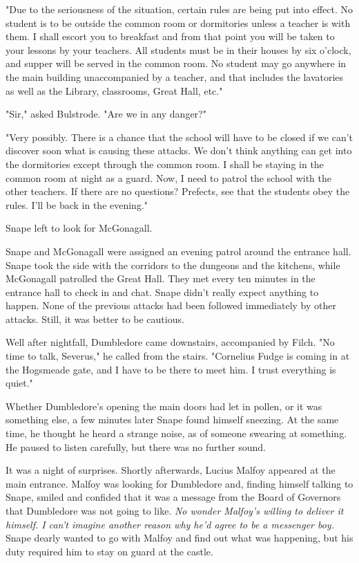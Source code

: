 "Due to the seriousness of the situation, certain rules are being put into effect. No student is to be outside the common room or dormitories unless a teacher is with them. I shall escort you to breakfast and from that point you will be taken to your lessons by your teachers. All students must be in their houses by six o'clock, and supper will be served in the common room. No student may go anywhere in the main building unaccompanied by a teacher, and that includes the lavatories as well as the Library, classrooms, Great Hall, etc."

"Sir," asked Bulstrode. "Are we in any danger?"

"Very possibly. There is a chance that the school will have to be closed if we can't discover soon what is causing these attacks. We don't think anything can get into the dormitories except through the common room. I shall be staying in the common room at night as a guard. Now, I need to patrol the school with the other teachers. If there are no questions? Prefects, see that the students obey the rules. I'll be back in the evening."

Snape left to look for McGonagall.

Snape and McGonagall were assigned an evening patrol around the entrance hall. Snape took the side with the corridors to the dungeons and the kitchens, while McGonagall patrolled the Great Hall. They met every ten minutes in the entrance hall to check in and chat. Snape didn't really expect anything to happen. None of the previous attacks had been followed immediately by other attacks. Still, it was better to be cautious.

Well after nightfall, Dumbledore came downstairs, accompanied by Filch. "No time to talk, Severus," he called from the stairs. "Cornelius Fudge is coming in at the Hogsmeade gate, and I have to be there to meet him. I trust everything is quiet."

Whether Dumbledore's opening the main doors had let in pollen, or it was something else, a few minutes later Snape found himself sneezing. At the same time, he thought he heard a strange noise, as of someone swearing at something. He paused to listen carefully, but there was no further sound.

It was a night of surprises. Shortly afterwards, Lucius Malfoy appeared at the main entrance. Malfoy was looking for Dumbledore and, finding himself talking to Snape, smiled and confided that it was a message from the Board of Governors that Dumbledore was not going to like. \emph{No wonder Malfoy's willing to deliver it himself. I can't imagine another reason why he'd agree to be a messenger boy.} Snape dearly wanted to go with Malfoy and find out what was happening, but his duty required him to stay on guard at the castle.

